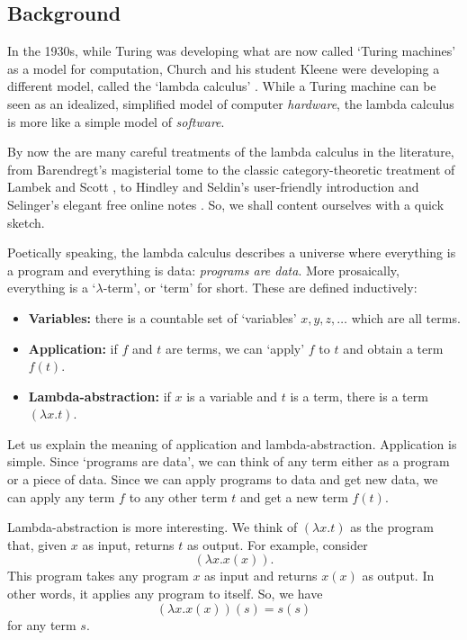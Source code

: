 \documentclass[12pt]{article}
\begin{document}
\subsection{Background}
\label{computation_overview}

In the 1930s, while Turing was developing what are now called `Turing
machines' as a model for computation, Church and his student Kleene
were developing a different model, called the `lambda calculus'
\cite{Church, Kleene}.  While a Turing machine can be seen as an
idealized, simplified model of computer {\it hardware}, the lambda
calculus is more like a simple model of {\it software}.

By now the are many careful treatments of the lambda calculus in 
the literature, from Barendregt's magisterial tome \cite{Barendregt}
to the classic category-theoretic treatment of Lambek and Scott
\cite{LS}, to Hindley and Seldin's user-friendly introduction 
\cite{HS} and Selinger's elegant free online notes \cite{Selinger2}.  So, 
we shall content ourselves with a quick sketch.

Poetically speaking, the lambda calculus describes a universe where
everything is a program and everything is data: {\it programs are
data}.  More prosaically, everything is a `$\lambda$-term', or `term'
for short.  These are defined inductively:
\begin{itemize}
\item {\bf Variables:}
there is a countable set of `variables' $x, y, z, \dots$
which are all terms. 
\item {\bf Application:}
if $f$ and $t$ are terms, we can `apply' $f$
to $t$ and obtain a term $f(t)$.
\item {\bf Lambda-abstraction:} if 
$x$ is a variable and $t$ is a term, there is a term 
$(\lambda x . t)$.
\end{itemize}

Let us explain the meaning of application and lambda-abstraction.
Application is simple.  Since `programs are data', we can think of any
term either as a program or a piece of data.  Since we can apply
programs to data and get new data, we can apply any term $f$ to any
other term $t$ and get a new term $f(t)$.

Lambda-abstraction is more interesting.  We think of $(\lambda x.t)$
as the program that, given $x$ as input, returns $t$ as output.  
For example, consider
\[       (\lambda x. x(x)) . \]
This program takes any program $x$ as input and returns $x(x)$ as 
output.  In other words, it applies any program to itself. 
So, we have
\[       (\lambda x . x(x))(s) = s(s) \]
for any term $s$.  
\end{document}
